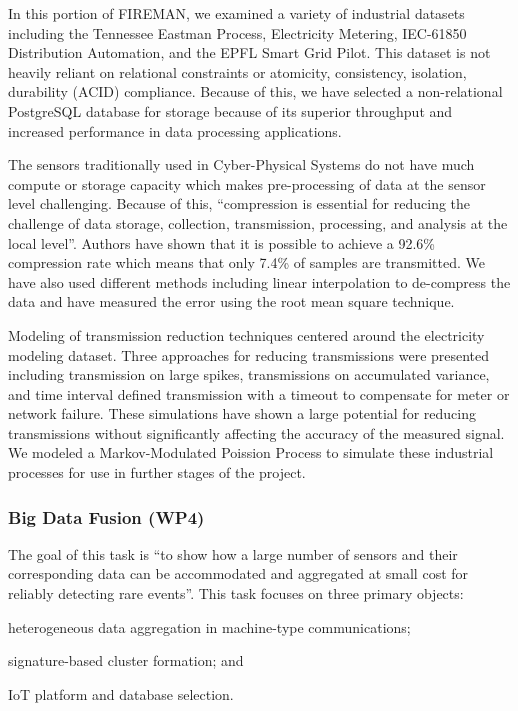 In this portion of FIREMAN, we examined a  variety of industrial datasets including the Tennessee Eastman Process, Electricity Metering, IEC-61850 Distribution Automation, and the EPFL Smart Grid Pilot. This dataset is not heavily reliant on relational constraints or atomicity, consistency, isolation, durability (ACID) compliance. Because of this, we have selected a non-relational PostgreSQL database for storage because of its superior throughput and increased performance in data processing applications.

The sensors traditionally used in Cyber-Physical Systems do not have much compute or storage capacity which makes pre-processing of data at the sensor level challenging. Because of this, \enquote{compression is essential for reducing the challenge of data storage, collection, transmission, processing, and analysis at the local level}\parencite{compression}. Authors \cite{wp3.2} have shown that it is possible to achieve a 92.6\% compression rate which means that only 7.4\% of samples are transmitted. We have also used different methods including linear interpolation to de-compress the data and have measured the error using the root mean square technique. 


Modeling of transmission reduction techniques centered around the electricity modeling dataset. Three approaches for reducing transmissions were presented including transmission on large spikes, transmissions on accumulated variance, and time interval defined transmission with a timeout to compensate for meter or network failure. These simulations have shown a large potential for reducing transmissions without significantly affecting the accuracy of the measured signal. We modeled a Markov-Modulated Poission Process to simulate these industrial processes for use in further stages of the project.

\subsubsection{Big Data Fusion (WP4)}
\label{ref_wp4}
The goal of this task is \enquote{to show how a large number of sensors and their corresponding data can be  accommodated and aggregated at small cost for reliably detecting rare events}\parencite{wp4.1}. This task focuses on three primary objects: 
\begin{inlinelist}
    \item heterogeneous data aggregation in machine-type communications;
    \item signature-based cluster formation; and
    \item IoT platform and database selection.
\end{inlinelist}


